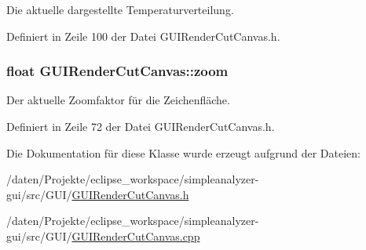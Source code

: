 Die aktuelle dargestellte Temperaturverteilung. 



Definiert in Zeile 100 der Datei G\-U\-I\-Render\-Cut\-Canvas.\-h.

\hypertarget{classGUIRenderCutCanvas_ac680bbbc673a6b336dcfc812c70a0779}{
\subsubsection[{zoom}]{\setlength{\rightskip}{0pt plus 5cm}float G\-U\-I\-Render\-Cut\-Canvas\-::zoom\hspace{0.3cm}{\ttfamily [private]}}}\label{classGUIRenderCutCanvas_ac680bbbc673a6b336dcfc812c70a0779}


Der aktuelle Zoomfaktor für die Zeichenfläche. 



Definiert in Zeile 72 der Datei G\-U\-I\-Render\-Cut\-Canvas.\-h.



Die Dokumentation für diese Klasse wurde erzeugt aufgrund der Dateien\-:\begin{DoxyCompactItemize}
\item 
/daten/\-Projekte/eclipse\-\_\-workspace/simpleanalyzer-\/gui/src/\-G\-U\-I/\hyperlink{GUIRenderCutCanvas_8h}{G\-U\-I\-Render\-Cut\-Canvas.\-h}\item 
/daten/\-Projekte/eclipse\-\_\-workspace/simpleanalyzer-\/gui/src/\-G\-U\-I/\hyperlink{GUIRenderCutCanvas_8cpp}{G\-U\-I\-Render\-Cut\-Canvas.\-cpp}\end{DoxyCompactItemize}
